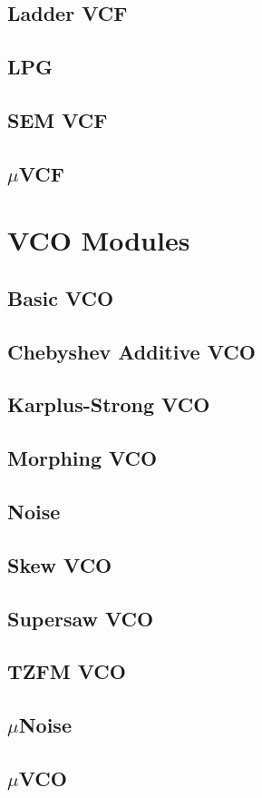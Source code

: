 \documentclass[11pt]{book}
\begin{document}
\section{Ladder VCF}
\pagebreak
\section{LPG}
\pagebreak
\section{SEM VCF}
\pagebreak
\section{$\mu$VCF}
\pagebreak

\chapter{VCO Modules}
\pagebreak
\section{Basic VCO}
\pagebreak
\section{Chebyshev Additive VCO}
\pagebreak
\section{Karplus-Strong VCO}
\pagebreak
\section{Morphing VCO}
\pagebreak
\section{Noise}
\pagebreak
\section{Skew VCO}
\pagebreak
\section{Supersaw VCO}
\pagebreak
\section{TZFM VCO}
\pagebreak
\section{$\mu$Noise}
\pagebreak
\section{$\mu$VCO}
\pagebreak
\end{document}
